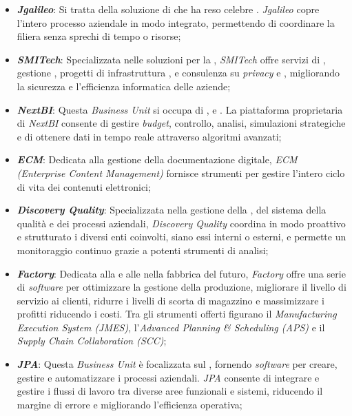 \begin{itemize}
    \item \textbf{\emph{Jgalileo}}: Si tratta della soluzione di  che ha reso celebre \myCompany. \emph{Jgalileo} copre l'intero processo aziendale in modo integrato, permettendo di coordinare la filiera senza sprechi di tempo o risorse;
    \item \textbf{\emph{SMITech}}: Specializzata nelle soluzioni per la , \emph{SMITech} offre servizi di ,  gestione , progetti di infrastruttura , e consulenza su \emph{privacy} e , migliorando la sicurezza e l'efficienza informatica delle aziende;
    \item \textbf{\emph{NextBI}}: Questa \emph{Business Unit} si occupa di ,  e . La piattaforma proprietaria di \emph{NextBI} consente di gestire \emph{budget}, controllo, analisi, simulazioni strategiche e di ottenere dati in tempo reale attraverso algoritmi avanzati;
    \item \textbf{\emph{ECM}}: Dedicata alla gestione della documentazione digitale, \emph{ECM (Enterprise Content Management)}
    fornisce strumenti per gestire l'intero ciclo di vita dei contenuti elettronici;
    \item \textbf{\emph{Discovery Quality}}: Specializzata nella gestione della , del sistema della qualità e dei processi aziendali, \emph{Discovery Quality} coordina in modo proattivo e strutturato i diversi enti coinvolti, siano essi interni o esterni, e permette un monitoraggio continuo grazie a potenti strumenti di analisi;
    \item \textbf{\emph{Factory}}: Dedicata alla  e alle  nella fabbrica del futuro, \emph{Factory} offre una serie di \emph{software} per ottimizzare la gestione della produzione, migliorare il livello di servizio ai clienti, ridurre i livelli di scorta di magazzino e massimizzare i profitti riducendo i costi. Tra gli strumenti offerti figurano il \emph{Manufacturing Execution System (JMES)}, l'\emph{Advanced Planning \& Scheduling (APS)} e il \emph{Supply Chain Collaboration (SCC)};
    \item \textbf{\emph{JPA}}: Questa \emph{Business Unit} è focalizzata sul , fornendo \emph{software} per creare, gestire e automatizzare i processi aziendali. \emph{JPA} consente di integrare e gestire i flussi di lavoro tra diverse aree funzionali e sistemi, riducendo il margine di errore e migliorando l'efficienza operativa;

\end{itemize}
